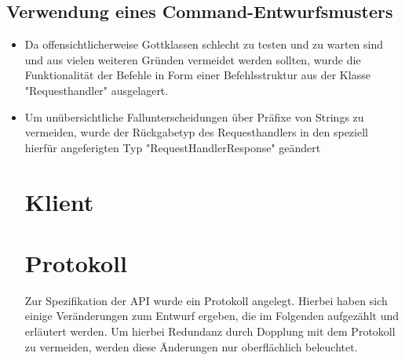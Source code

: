 \documentclass[parskip=full,11pt]{scrartcl}
\begin{document}
\subsection{Verwendung eines Command-Entwurfsmusters}
	\begin{itemize}
	\item Da offensichtlicherweise Gottklassen schlecht zu testen und zu warten sind und
	aus vielen weiteren Gründen vermeidet werden sollten, wurde die Funktionalität
	der Befehle in Form einer Befehlsstruktur aus der Klasse "Requesthandler"
	ausgelagert.
	\item Um unübersichtliche Fallunterscheidungen über Präfixe von Strings
	zu vermeiden, wurde der Rückgabetyp des Requesthandlers in den speziell
	hierfür angeferigten Typ "RequestHandlerResponse" geändert


\pagebreak
\section{Klient}



\pagebreak
\section{Protokoll}

Zur Spezifikation der API wurde ein Protokoll angelegt.
Hierbei haben sich einige Veränderungen zum Entwurf ergeben,
die im Folgenden aufgezählt und erläutert werden.
Um hierbei Redundanz durch Dopplung mit dem Protokoll zu vermeiden,
werden diese Änderungen nur oberflächlich beleuchtet.


\end{itemize}
\end{document}
